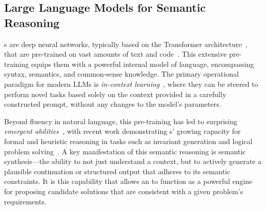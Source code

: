 \subsection{Large Language Models for Semantic Reasoning}
\LLM{}s are deep neural networks, typically based on the Transformer architecture~\cite{vaswani2017attention}, that are pre-trained on vast amounts of text and code~\cite{devlin2019bert}. This extensive pre-training equips them with a powerful internal model of language, encompassing syntax, semantics, and common-sense knowledge. The primary operational paradigm for modern LLMs is \textit{in-context learning}~\cite{brown2020language}, where they can be steered to perform novel tasks based solely on the context provided in a carefully constructed prompt, without any changes to the model's parameters.

Beyond fluency in natural language, this pre-training has led to surprising \textit{emergent abilities}~\cite{wei2022emergent}, with recent work demonstrating \LLM{}s' growing capacity for formal and heuristic reasoning in tasks such as invariant generation and logical problem solving~\cite{kamath2023finding, pan2023logiclm}. A key manifestation of this semantic reasoning is semantic synthesis---the ability to not just understand a context, but to actively generate a plausible continuation or structured output that adheres to its semantic constraints. It is this capability that allows an \LLM{} to function as a powerful engine for proposing candidate solutions that are consistent with a given problem's requirements.



